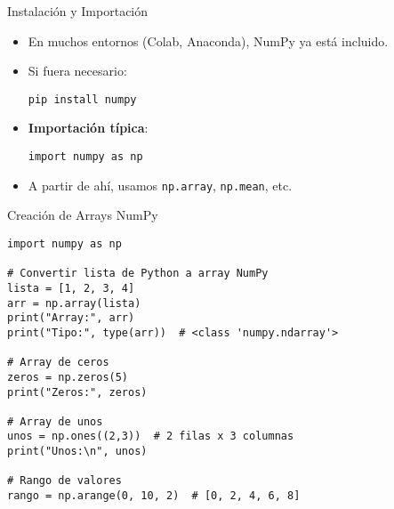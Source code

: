 \documentclass[10pt]{beamer}
\begin{document}
\begin{frame}[fragile]{Instalación y Importación}
  \begin{itemize}
    \item En muchos entornos (Colab, Anaconda), NumPy ya está incluido.
    \item Si fuera necesario:
\begin{verbatim}
pip install numpy
\end{verbatim}
    \item \textbf{Importación típica}:
\begin{verbatim}
import numpy as np
\end{verbatim}
    \item A partir de ahí, usamos \texttt{np.array}, \texttt{np.mean}, etc.
  \end{itemize}
\end{frame}

\begin{frame}[fragile]{Creación de Arrays NumPy}
\begin{verbatim}
import numpy as np

# Convertir lista de Python a array NumPy
lista = [1, 2, 3, 4]
arr = np.array(lista)
print("Array:", arr)
print("Tipo:", type(arr))  # <class 'numpy.ndarray'>

# Array de ceros
zeros = np.zeros(5)
print("Zeros:", zeros)

# Array de unos
unos = np.ones((2,3))  # 2 filas x 3 columnas
print("Unos:\n", unos)

# Rango de valores
rango = np.arange(0, 10, 2)  # [0, 2, 4, 6, 8]
\end{verbatim}
\end{frame}
\end{document}
